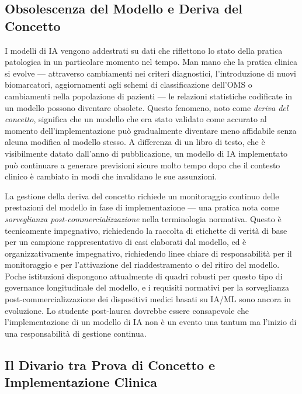 \subsection{Obsolescenza del Modello e Deriva del Concetto}

I modelli di IA vengono addestrati su dati che riflettono lo stato della pratica patologica in un particolare momento nel tempo. Man mano che la pratica clinica si evolve — attraverso cambiamenti nei criteri diagnostici, l'introduzione di nuovi biomarcatori, aggiornamenti agli schemi di classificazione dell'OMS o cambiamenti nella popolazione di pazienti — le relazioni statistiche codificate in un modello possono diventare obsolete. Questo fenomeno, noto come \emph{deriva del concetto}, significa che un modello che era stato validato come accurato al momento dell'implementazione può gradualmente diventare meno affidabile senza alcuna modifica al modello stesso. A differenza di un libro di testo, che è visibilmente datato dall'anno di pubblicazione, un modello di IA implementato può continuare a generare previsioni sicure molto tempo dopo che il contesto clinico è cambiato in modi che invalidano le sue assunzioni.

La gestione della deriva del concetto richiede un monitoraggio continuo delle prestazioni del modello in fase di implementazione — una pratica nota come \emph{sorveglianza post-commercializzazione} nella terminologia normativa. Questo è tecnicamente impegnativo, richiedendo la raccolta di etichette di verità di base per un campione rappresentativo di casi elaborati dal modello, ed è organizzativamente impegnativo, richiedendo linee chiare di responsabilità per il monitoraggio e per l'attivazione del riaddestramento o del ritiro del modello. Poche istituzioni dispongono attualmente di quadri robusti per questo tipo di governance longitudinale del modello, e i requisiti normativi per la sorveglianza post-commercializzazione dei dispositivi medici basati su IA/ML sono ancora in evoluzione. Lo studente post-laurea dovrebbe essere consapevole che l'implementazione di un modello di IA non è un evento una tantum ma l'inizio di una responsabilità di gestione continua.

\subsection{Il Divario tra Prova di Concetto e Implementazione Clinica}

